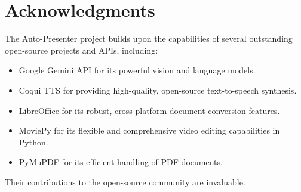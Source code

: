 \documentclass{article}
\begin{document}
\section{Acknowledgments}
The Auto-Presenter project builds upon the capabilities of several outstanding open-source projects and APIs, including:
\begin{itemize}
    \item Google Gemini API for its powerful vision and language models.
    \item Coqui TTS for providing high-quality, open-source text-to-speech synthesis.
    \item LibreOffice for its robust, cross-platform document conversion features.
    \item MoviePy for its flexible and comprehensive video editing capabilities in Python.
    \item PyMuPDF for its efficient handling of PDF documents.
\end{itemize}
Their contributions to the open-source community are invaluable.
\end{document}
